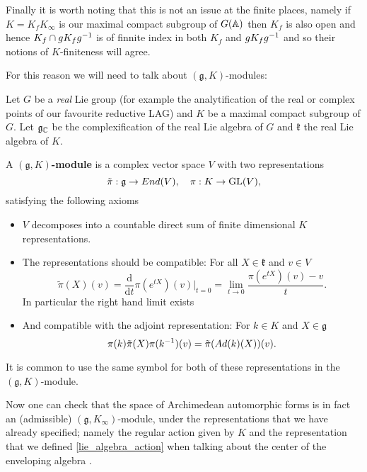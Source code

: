 \begin{example}
    Finally it is worth noting that this is not an issue at the finite places, namely if \(K = K_fK_\infty\) is our maximal compact subgroup of \(G(\A)\) then \(K_f\) is also open and hence \(K_f \cap gK_f g^{-1}\) is of finnite index in both \(K_f\) and \(gK_f g^{-1}\) and so their notions of \(K\)-finiteness will agree. 
\end{example}

For this reason we will need to talk about \((\mathfrak{g}, K)\)-modules:

\begin{definition}
    Let \(G\) be a \textit{real} Lie group (for example the analytification of the real or complex points of our favourite reductive LAG) and \(K\) be a maximal compact subgroup of \(G\). Let \(\mathfrak{g}_\C\) be the complexification of the real Lie algebra of \(G\) and \(\mathfrak{k}\) the real Lie algebra of \(K\). 
    
    A \textbf{\((\mathfrak{g}, K)\)-module} is a complex vector space \(V\) with two representations 
    \[\tilde{\pi}: \mathfrak{g} \to End(V), \quad \pi: K\to \operatorname{GL}(V),\]
    satisfying the following axioms
    \begin{itemize}
        \item \(V\) decomposes into a countable direct sum of finite dimensional \(K\) representations.
        \item The representations should be compatible: For all \(X \in \mathfrak{k}\) and \(v\in V\)
        \[\tilde{\pi}(X)(v) = \frac{\mathrm{d}}{\mathrm{d}t}\pi(e^{tX})(v)|_{t=0} = \lim_{t\to 0}\frac{\pi(e^{tX})(v) - v}{t}.\]
        In particular the right hand limit exists
        \item And compatible with the adjoint representation: For \(k\in K\) and \(X\in \mathfrak{g}\) 
         \[\pi(k)\tilde{\pi}(X) \pi(k^{-1} )(v) = \tilde{\pi}(Ad(k)(X))(v).\]
    \end{itemize}
\end{definition}

\begin{remark}
    It is common to use the same symbol for both of these representations in the \((\mathfrak{g}, K)\)-module.
\end{remark}
Now one can check that the space of Archimedean automorphic forms is in fact an (admissible) \((\mathfrak{g}, K_\infty)\)-module, under the representations that we have already specified; namely the regular action given by \(K\) and the representation that we defined \ref{lie_algebra_action} when talking about the center of the enveloping algebra \cite[Thm. 6.2.6]{getzIntroductionAutomorphicRepresentations2024}.

